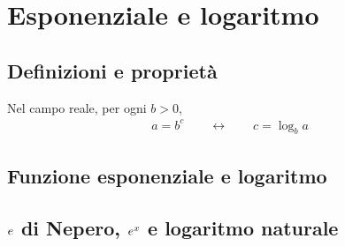 \documentclass[letterpaper,10pt,english]{jupyterBook}
\begin{document}
\sphinxstepscope


\chapter{Esponenziale e logaritmo}
\label{\detokenize{ch/exponential_logarithm:esponenziale-e-logaritmo}}\label{\detokenize{ch/exponential_logarithm:math-hs-exp-log}}\label{\detokenize{ch/exponential_logarithm::doc}}

\section{Definizioni e proprietà}
\label{\detokenize{ch/exponential_logarithm:definizioni-e-proprieta}}
\sphinxAtStartPar
Nel campo reale, per ogni \(b > 0\),
\begin{equation*}
\begin{split}a = b^c \qquad \leftrightarrow \qquad c = \log_{b} a \end{split}
\end{equation*}

\section{Funzione esponenziale e logaritmo}
\label{\detokenize{ch/exponential_logarithm:funzione-esponenziale-e-logaritmo}}

\section{\protect\(e\protect\) di Nepero, \protect\(e^x\protect\) e logaritmo naturale}
\label{\detokenize{ch/exponential_logarithm:e-di-nepero-e-x-e-logaritmo-naturale}}
\end{document}
